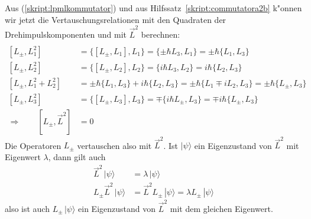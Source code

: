Aus (\ref{skript:lpmlkommutator}) und aus
Hilfssatz~\ref{skript:commutatora2b} k"onnen wir jetzt die
Vertauschungsrelationen mit den Quadraten der Drehimpulskomponenten
und mit $\vec L^2$ berechnen:
\begin{align*}
\\
[L_\pm,L_1^2]
&=
\{ [L_\pm, L_1], L_1 \}
=
\{ \pm \hbar L_3, L_1 \}
=
\pm \hbar \{ L_1, L_3 \}
\\
[L_\pm,L_2^2]
&=
\{ [L_\pm, L_2], L_2 \}
=
\{ i\hbar L_3, L_2 \}
=
i\hbar \{ L_2, L_3 \}
\\
[L_\pm,L_1^2 + L_2^2]
&=
\pm \hbar \{ L_1, L_3 \}
+
i\hbar \{ L_2, L_3 \}
=
\pm \hbar \{ L_1 \mp iL_2, L_3 \}
=
\pm \hbar\{L_\pm, L_3\}
\\
[L_\pm,L_3^2]
&=
\{ [L_\pm, L_3], L_3 \}
=
\mp \{ i\hbar L_\pm, L_3 \}
=
\mp i\hbar \{ L_\pm, L_3 \}
\\
\Rightarrow\qquad [L_\pm,\vec L^2]
&=0
\end{align*}
Die Operatoren $L_\pm$ vertauschen also mit $\vec L^2$.
Ist $|\psi\rangle$ ein Eigenzustand von $\vec L^2$ mit Eigenwert $\lambda$,
dann gilt auch 
\begin{align*}
\vec L^2\,|\psi\rangle&=\lambda\,|\psi\rangle
\\
L_\pm\vec L^2\,|\psi\rangle&=
\vec L^2L_\pm\,|\psi\rangle=
\lambda L_\pm\,|\psi\rangle
\end{align*}
also ist  auch $L_\pm\,|\psi\rangle$ ein Eigenzustand von $\vec L^2$ mit
dem gleichen Eigenwert.

%
